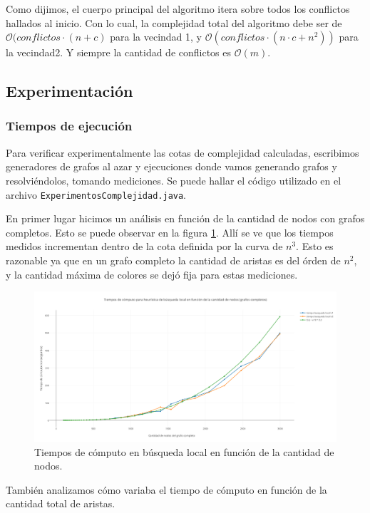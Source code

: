 Como dijimos, el cuerpo principal del algoritmo itera sobre todos los conflictos hallados al inicio. Con lo cual, la complejidad total del algoritmo debe ser de $\mathcal{O}(conflictos \cdot (n+c)$ para la vecindad 1, y $\mathcal{O}(conflictos \cdot (n \cdot c + n^2))$ para la vecindad2. Y siempre la cantidad de conflictos es $\mathcal{O}(m)$.

\subsection{Experimentación}

\subsubsection{Tiempos de ejecución}

Para verificar experimentalmente las cotas de complejidad calculadas, escribimos generadores de grafos al azar y ejecuciones donde vamos generando grafos y resolviéndolos, tomando mediciones. Se puede hallar el código utilizado en el archivo \texttt{ExperimentosComplejidad.java}.

En primer lugar hicimos un análisis en función de la cantidad de nodos con grafos completos. Esto se puede observar en la figura \ref{nodosEj4}. Allí se ve que los tiempos medidos incrementan dentro de la cota definida por la curva de $n^3$. Esto es razonable ya que en un grafo completo la cantidad de aristas es del órden de $n^2$, y la cantidad máxima de colores se dejó fija para estas mediciones.

\begin{figure}[H]
	\centering
 	\includegraphics[width=18cm]{imagenes/Ej4/TvsNodos.png}
	\caption{Tiempos de cómputo en búsqueda local en función de la cantidad de nodos.}
	\label{nodosEj4}
 \end{figure}
 
También analizamos cómo variaba el tiempo de cómputo en función de la cantidad total de aristas. 

